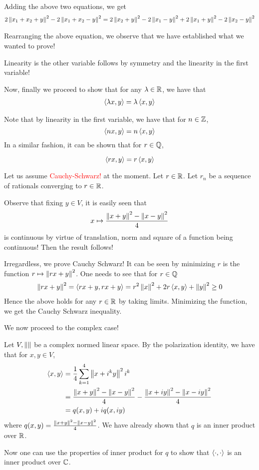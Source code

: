 Adding the above two equations, we get
\begin{align*}
    2\left\lVert x_{1} + x_{2} + y \right\rVert^{2} - 2\left\lVert x_{1} +x_{2} -y  \right\rVert^{2} = 2 \left\lVert x_{2} + y \right\rVert^{2} - 2 \left\lVert x_{1} -y \right\rVert^{2} + 2 \left\lVert x_{1} + y \right\rVert ^{2} -2 \left\lVert x_{2}-y \right\rVert^{2}
\end{align*}

Rearranging the above equation, we observe that we have established what we wanted to prove!

Linearity is the other variable follows by symmetry and the linearity in the first variable!

Now, finally we proceed to show that for any $\lambda \in \mathbb R$, we have that 
\begin{align*}
    \left\langle \lambda x, y \right\rangle = \lambda \left\langle x,y \right\rangle
\end{align*}

Note that by linearity in the first variable, we have that for $n\in \mathbb Z$,
\begin{equation*}
    \left\langle nx,y \right\rangle = n \left\langle x,y \right\rangle
\end{equation*}
In a similar fashion, it can be shown that for $r\in \mathbb Q$,

\begin{equation*}
    \left\langle rx,y \right\rangle = r \left\langle x,y \right\rangle
\end{equation*}

Let us assume \textcolor{red}{Cauchy-Schwarz!} at the moment. Let $r\in \mathbb R$. Let $r_{n}$ be a sequence of rationals converging to $r\in \mathbb R$.

Observe that fixing $y\in V$, it is easily seen that 
\begin{equation*}
    x \mapsto \frac{\left\lVert x+y \right\rVert^{2} - \left\lVert x-y \right\rVert^{2}}{4}
\end{equation*}
is continuous by virtue of translation, norm and square of a function being continuous!
Then the result follows!

Irregardless, we prove Cauchy Schwarz! It can be seen by minimizing $r$ is the function $r \mapsto \left\lVert rx + y \right\rVert^{2}$. One needs to see that for $r\in \mathbb Q$
\begin{align*}
    \left\lVert rx+y \right\rVert^{2} = \left\langle rx+y , rx +y \right\rangle
    = r^{2} \left\lVert x \right\rVert^{2} + 2r\left\langle x,y \right\rangle + \left\lVert y \right\rVert^{2} \ge 0
\end{align*}
Hence the above holds for any $r\in \mathbb R$ by taking limits. Minimizing the function, we get the Cauchy Schwarz inequality.


We now proceed to the complex case!

Let $V, \left\lVert  \right\rVert$ be a complex normed linear space. By the polarization identity, we have that for $x, y \in V$,
\begin{align*}
    \left\langle x,y \right\rangle &= \frac{1}{4} \sum_{k=1}^{4} \left\lVert x+i^{k}y \right\rVert^{2} i^{k} \\
    &= \frac{\left\lVert x+y \right\rVert^{2} - \left\lVert x-y \right\rVert^{2}}{4} - \frac{\left\lVert x+iy \right\rVert^{2} - \left\lVert x-iy \right\rVert^{2}}{4} \\
    &= q(x,y)+i q(x,iy)
\end{align*}
where $q(x,y)=  \frac{\left\lVert x+y \right\rVert^{2} - \left\lVert x-y \right\rVert^{2}}{4}$. We have already shown that $q$ is an inner product over $\mathbb R$. 

Now one can use the properties of inner product for $q$ to show that $\left\langle \cdot , \cdot \right\rangle$ is an inner product over $\mathbb C$.

